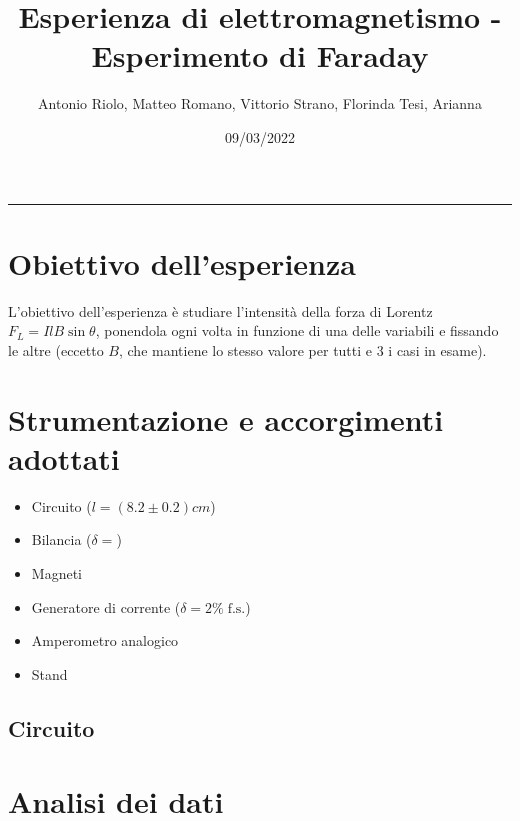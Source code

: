 \documentclass[11pt, a4paper]{article}
\title{Esperienza di elettromagnetismo - Esperimento di Faraday}
\author{Antonio Riolo, Matteo Romano, Vittorio Strano, Florinda Tesi, Arianna } %
\date{09/03/2022} %
\numberwithin{equation}{section} %
\begin{document}
\maketitle

\tableofcontents

\rule{\textwidth}{1px}

    \section{Obiettivo dell'esperienza}

    L'obiettivo dell'esperienza è studiare l'intensità della forza di Lorentz $F_{L} = IlB \sin \theta$, ponendola ogni volta in funzione di una delle variabili e fissando le altre (eccetto $B$, che mantiene lo stesso valore per tutti e 3 i casi in esame).

    \section{Strumentazione e accorgimenti adottati} %

    \begin{itemize}
        \item Circuito ($l = (8.2 \pm 0.2)cm$)
        \item Bilancia ($\delta =$) %
        \item Magneti 
        \item Generatore di corrente ($\delta = 2\% \; \text{f.s.}$) %
        \item Amperometro analogico
        \item Stand %
    \end{itemize}


    \subsection{Circuito}


    \section{Analisi dei dati}
    
\end{document}
